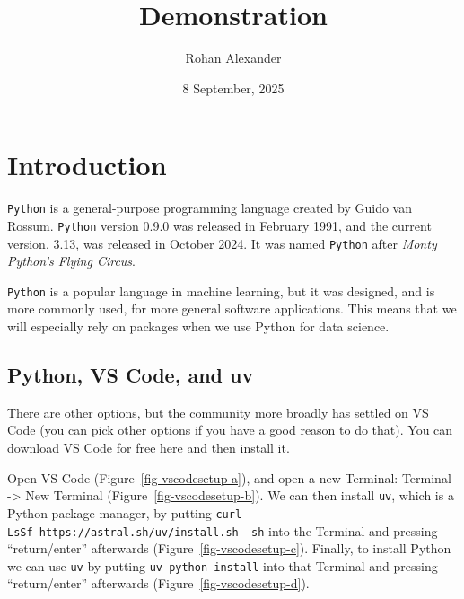 \documentclass[
  letterpaper,
  DIV=11,
  numbers=noendperiod]{scrartcl}
\title{Demonstration}
\author{Rohan Alexander}
\date{8 September, 2025}
\begin{document}
\maketitle


\section{Introduction}\label{introduction}

\texttt{Python} is a general-purpose programming language created by
Guido van Rossum. \texttt{Python} version 0.9.0 was released in February
1991, and the current version, 3.13, was released in October 2024. It
was named \texttt{Python} after \emph{Monty Python's Flying Circus}.

\texttt{Python} is a popular language in machine learning, but it was
designed, and is more commonly used, for more general software
applications. This means that we will especially rely on packages when
we use Python for data science.

\subsection{Python, VS Code, and uv}\label{python-vs-code-and-uv}

There are other options, but the community more broadly has settled on
VS Code (you can pick other options if you have a good reason to do
that). You can download VS Code for free
\href{https://code.visualstudio.com}{here} and then install it.

Open VS Code (Figure~\ref{fig-vscodesetup-a}), and open a new Terminal:
Terminal -\textgreater{} New Terminal (Figure~\ref{fig-vscodesetup-b}).
We can then install \texttt{uv}, which is a Python package manager, by
putting
\texttt{curl\ -LsSf\ https://astral.sh/uv/install.sh\ \textbar{}\ sh}
into the Terminal and pressing ``return/enter'' afterwards
(Figure~\ref{fig-vscodesetup-c}). Finally, to install Python we can use
\texttt{uv} by putting \texttt{uv\ python\ install} into that Terminal
and pressing ``return/enter'' afterwards
(Figure~\ref{fig-vscodesetup-d}).
\end{document}
